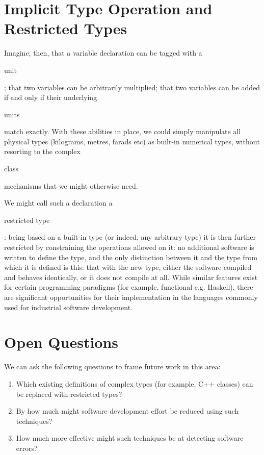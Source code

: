 \documentclass{eceasst}
\begin{document}
\section{Implicit Type Operation and Restricted Types}

Imagine, then, that a variable declaration can be tagged with
a \begin{em}unit\end{em}; that two variables can be arbitrarily
multiplied; that two variables can be added if and only if their
underlying \begin{em}units\end{em} match exactly. With these abilities
in place, we could simply manipulate all physical types (kilograms,
metres, farads etc) as built-in numerical types, without resorting to
the complex \begin{em}class\end{em} mechanisms that we might otherwise
need.

We might call such a declaration a \begin{em}restricted type\end{em}:
being based on a built-in type (or indeed, any arbitrary type) it is
then further restricted by constraining the operations allowed on it:
no additional software is written to define the type, and the only
distinction between it and the type from which it is defined is this:
that with the new type, either the software compiled and behaves
identically, or it does not compile at all. While similar features
exist for certain programming paradigms (for example, functional
e.g. Haskell), there are significant opportunities for their
implementation in the languages commonly used for industrial software
development.


\section{Open Questions}

We can ask the following questions to frame future work in this area:

\begin{enumerate}

\item Which existing definitions of complex types (for example, C++
classes) can be replaced with restricted types?

\item By how much might software development effort be reduced using such techniques?

\item How much more effective might such techniques be at detecting software errors?

\end{enumerate}


%
%
\end{document}
